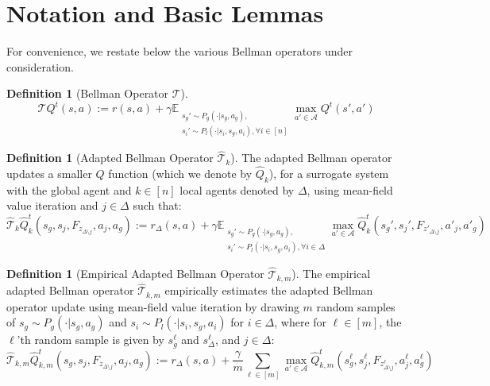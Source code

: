 \documentclass{article}
\theoremstyle{plain}
\theoremstyle{definition}
\newtheorem{definition}[theorem]{Definition}
\def\E{\mathbb{E}}
\begin{document}
\section{Notation and Basic Lemmas}
\label{sec: appendix-preliminaries}
For convenience, we restate below the various Bellman operators under consideration.

\begin{definition}[Bellman Operator $\mathcal{T}$]\label{defn:bellman}
\begin{equation}
\mathcal{T}Q^t(s,a) := r(s,a) + \gamma\E_{\substack{s_g'\sim P_g(\cdot|s_g,a_g),\\ s_i'\sim P_l(\cdot|s_i,s_g,a_i),\forall i\in[n]}} \max_{a'\in\mathcal{A}} Q^t(s',a')
\end{equation}
\end{definition}

\begin{definition}[Adapted Bellman Operator $\hat{\mathcal{T}}_k$]\label{defn:adapted bellman} The adapted Bellman operator updates a smaller $Q$ function (which we denote by $\hat{Q}_k$), for a surrogate system with the global agent and $k\in[n]$ local agents denoted by $\Delta$, using mean-field value iteration and $j\in\Delta$ such that:
\begin{equation}
\hat{\mathcal{T}}_k\hat{Q}_k^t(s_g,s_j, F_{z_{\Delta\setminus j}},a_j,a_g):= r_\Delta(s,a) + \gamma \E_{\substack{s_g'\sim P_g(\cdot|s_g,a_g), \\ s_i'\sim P_l(\cdot|s_i,s_g,a_i),\forall i\in\Delta}} \max_{a'\in\mathcal{A}} \hat{Q}_k^t(s_g',s_j', F_{z'_{\Delta\setminus j}},a'_j,a'_g)
\end{equation}
\end{definition}
\begin{definition}[Empirical Adapted Bellman Operator $\hat{\mathcal{T}}_{k,m}$] \label{defn:empirical adapted bellman}The empirical adapted Bellman operator $\hat{\mathcal{T}}_{k,m}$ empirically estimates the adapted Bellman operator update using mean-field value iteration by drawing $m$ random samples of $s_g\sim P_g(\cdot|s_g,a_g)$ and $s_i\sim P_l(\cdot|s_i,s_g,a_i)$ for $i\in\Delta$, where for $\ell\in[m]$, the $\ell$'th random sample is given by $s_g^\ell$ and $s_\Delta^\ell$, and $j\in\Delta$:
\begin{equation}
\hat{\mathcal{T}}_{k,m}\hat{Q}_{k,m}^t(s_g,s_j,F_{z_{\Delta\setminus j}},a_j,a_g):= r_\Delta(s,a) + \frac{\gamma}{m} \sum_{\ell \in [m]}\max_{a'\in\mathcal{A}} \hat{Q}_{k,m}^t(s_g^\ell,s_j^\ell, F_{z_{\Delta\setminus j}^\ell},a_j^\ell,a_g^\ell)
\end{equation}
\end{definition}
\end{document}
